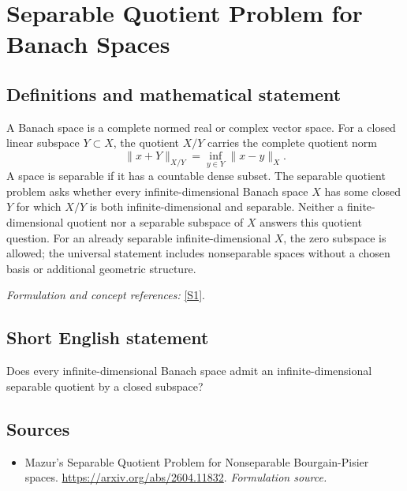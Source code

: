 \documentclass[11pt]{article}
\begin{document}
\section*{\texorpdfstring{Separable Quotient Problem for Banach Spaces}{Separable Quotient Problem for Banach Spaces}}\label{405}
\subsection{Definitions and mathematical statement}
A Banach space is a complete normed real or complex vector space. For a closed linear subspace $Y\subset X$, the quotient $X/Y$ carries the complete quotient norm
\[
 \|x+Y\|_{X/Y}=\inf_{y\in Y}\|x-y\|_X.
\]
A space is separable if it has a countable dense subset. The separable quotient problem asks whether every infinite-dimensional Banach space $X$ has some closed $Y$ for which $X/Y$ is both infinite-dimensional and separable. Neither a finite-dimensional quotient nor a separable subspace of $X$ answers this quotient question. For an already separable infinite-dimensional $X$, the zero subspace is allowed; the universal statement includes nonseparable spaces without a chosen basis or additional geometric structure.
\par\smallskip\textit{Formulation and concept references:} \href{https://arxiv.org/abs/2604.11832}{[S1]}.

\subsection{Short English statement}
Does every infinite-dimensional Banach space admit an infinite-dimensional separable quotient by a closed subspace?
\subsection{Sources}
\begin{itemize}
\item[S1]Mazur's Separable Quotient Problem for Nonseparable Bourgain-Pisier spaces.
\url{https://arxiv.org/abs/2604.11832}.
\textit{Formulation source.}
\end{itemize}
\end{document}
